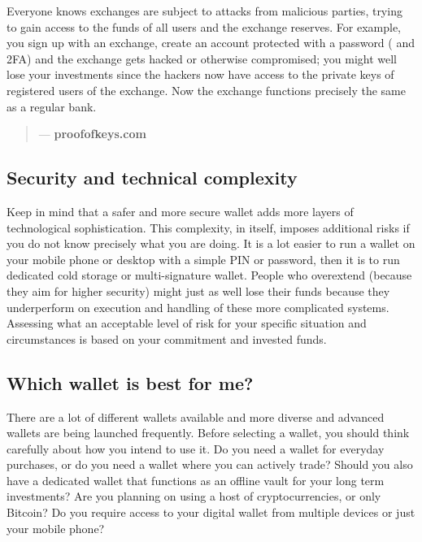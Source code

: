 Everyone knows exchanges are subject to attacks from malicious parties, trying to gain access to the funds of all users and the exchange reserves. For example, you sign up with an exchange, create an account protected with a password ( and 2FA) and the exchange gets hacked or otherwise compromised; you might well lose your investments since the hackers now have access to the private keys of registered users of the exchange. Now the exchange functions precisely the same as a regular bank. 
\medskip

\begin{quotation}

      \textit{}
      \begin{flushright}
        \small{--- \textbf{proofofkeys.com}}
      \end{flushright}
    
\end{quotation}

\subsection{Security and technical complexity}

Keep in mind that a safer and more secure wallet adds more layers of technological sophistication. This complexity, in itself, imposes additional risks if you do not know precisely what you are doing. It is a lot easier to run a wallet on your mobile phone or desktop with a simple PIN or password, then it is to run dedicated cold storage or multi-signature wallet. People who overextend (because they aim for higher security) might just as well lose their funds because they underperform on execution and handling of these more complicated systems. Assessing what an acceptable level of risk for your specific situation and circumstances is based on your commitment and invested funds.\medskip

\subsection*{Which wallet is best for me?}

There are a lot of different wallets available and more diverse and advanced wallets are being launched frequently. Before selecting a wallet, you should think carefully about how you intend to use it. Do you need a wallet for everyday purchases, or do you need a wallet where you can actively trade? Should you also have a dedicated wallet that functions as an offline vault for your long term investments? Are you planning on using a host of cryptocurrencies, or only Bitcoin? Do you require access to your digital wallet from multiple devices or just your mobile phone? 

